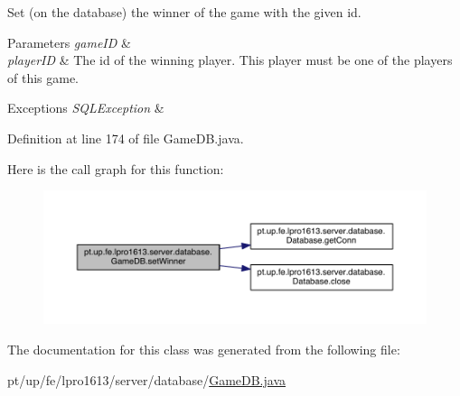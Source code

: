 Set (on the database) the winner of the game with the given id.


\begin{DoxyParams}{Parameters}
{\em game\+ID} & \\
\hline
{\em player\+ID} & The id of the winning player. This player must be one of the players of this game. \\
\hline
\end{DoxyParams}

\begin{DoxyExceptions}{Exceptions}
{\em S\+Q\+L\+Exception} & \\
\hline
\end{DoxyExceptions}


Definition at line 174 of file Game\+D\+B.\+java.

Here is the call graph for this function\+:
\nopagebreak
\begin{figure}[H]
\begin{center}
\leavevmode
\includegraphics[width=350pt]{classpt_1_1up_1_1fe_1_1lpro1613_1_1server_1_1database_1_1_game_d_b_a30f4664442da6b7ae80b1821aaa195fa_cgraph}
\end{center}
\end{figure}


The documentation for this class was generated from the following file\+:\begin{DoxyCompactItemize}
\item 
pt/up/fe/lpro1613/server/database/\hyperlink{_game_d_b_8java}{Game\+D\+B.\+java}\end{DoxyCompactItemize}
